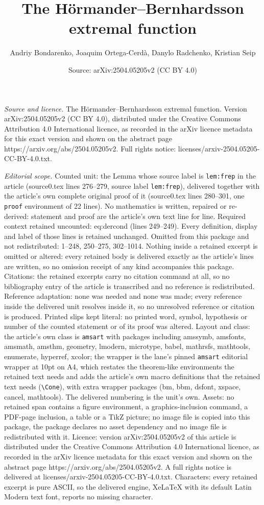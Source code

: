\documentclass[10pt,a4paper]{amsart}
\title[The H\"{o}rmander--Bernhardsson extremal function]{The H\"{o}rmander--Bernhardsson extremal function}
\author{Andriy Bondarenko, Joaquim Ortega-Cerd\`a, Danylo Radchenko, Kristian Seip}
\date{Source: arXiv:2504.05205v2 (CC BY 4.0)}
\begin{document}
\maketitle

\noindent\emph{Source and licence.} The H\"{o}rmander--Bernhardsson extremal function. Version arXiv:2504.05205v2 (CC BY 4.0), distributed under the Creative Commons Attribution 4.0 International licence, as recorded in the arXiv licence metadata for this exact version and shown on the abstract page https://arxiv.org/abs/2504.05205v2. Full rights notice: licenses/arxiv-2504.05205-CC-BY-4.0.txt.\par\smallskip

\noindent\textit{Editorial scope.} Counted unit: the Lemma whose source label is \texttt{lem:frep} in the article (source0.tex lines 276--279, source label \texttt{lem:frep}), delivered together with the article's own complete original proof of it (source0.tex lines 280--301, one \texttt{proof} environment of 22 lines). No mathematics is written, repaired or re-derived: statement and proof are the article's own text line for line. Required context retained uncounted: eq:dercond (lines 249--249). Every definition, display and label of those lines is retained unchanged. Omitted from this package and not redistributed: 1--248, 250--275, 302--1014. Nothing inside a retained excerpt is omitted or altered: every retained body is delivered exactly as the article's lines are written, so no omission receipt of any kind accompanies this package. Citations: the retained excerpts carry no citation command at all, so no bibliography entry of the article is transcribed and no reference is redistributed. Reference adaptation: none was needed and none was made; every reference inside the delivered unit resolves inside it, so no unresolved reference or citation is produced. Printed slips kept literal: no printed word, symbol, hypothesis or number of the counted statement or of its proof was altered. Layout and class: the article's own class is \texttt{amsart} with packages including amssymb, amsfonts, amsmath, amsthm, geometry, lmodern, microtype, babel, mathrsfs, mathtools, enumerate, hyperref, xcolor; the wrapper is the lane's pinned \texttt{amsart} editorial wrapper at 10pt on A4, which restates the theorem-like environments the retained text needs and adds the article's own macro definitions that the retained text needs (\texttt{\textbackslash Cone}), with extra wrapper packages (bm, bbm, dsfont, xspace, cancel, mathtools). The delivered numbering is the unit's own. Assets: no retained span contains a figure environment, a graphics-inclusion command, a PDF-page inclusion, a table or a TikZ picture; no image file is copied into this package, the package declares no asset dependency and no image file is redistributed with it. Licence: version arXiv:2504.05205v2 of this article is distributed under the Creative Commons Attribution 4.0 International licence, as recorded in the arXiv licence metadata for this exact version and shown on the abstract page https://arxiv.org/abs/2504.05205v2. A full rights notice is delivered at licenses/arxiv-2504.05205-CC-BY-4.0.txt. Characters: every retained excerpt is pure ASCII, so the delivered engine, XeLaTeX with its default Latin Modern text font, reports no missing character.
\end{document}
